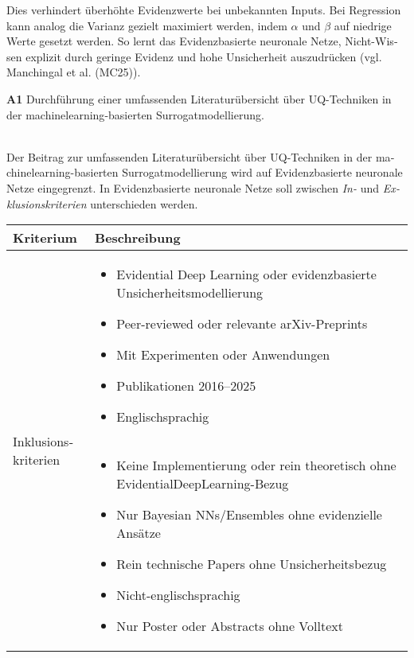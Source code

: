 \begin{otherlanguage}{ngerman}
Dies verhindert überhöhte Evidenzwerte bei unbekannten Inputs. Bei Regression kann analog die Varianz gezielt maximiert werden, indem $\alpha$ und $\beta$ auf niedrige Werte gesetzt werden. So lernt das \gls{Evidenzbasierte neuronale Netze}, Nicht-Wissen explizit durch geringe Evidenz und hohe Unsicherheit auszudrücken (vgl. Manchingal et al. (MC25)).



\pagebreak


\textbf{A1} Durchführung einer umfassenden Literaturübersicht über UQ-Techniken in der \gls{machinelearning}-basierten Surrogatmodellierung.
\par\noindent\\

Der Beitrag zur umfassenden Literaturübersicht über UQ-Techniken in der \gls{machinelearning}-basierten Surrogatmodellierung wird auf \gls{Evidenzbasierte neuronale Netze} eingegrenzt. In \gls{Evidenzbasierte neuronale Netze} soll zwischen \textit{In-} und \textit{Exklusionskriterien} unterschieden werden.

\begin{table}[htbp]
\centering
\footnotesize
\begin{tabularx}{\textwidth}{|l|X|}
\hline
\textbf{Kriterium} & \hspace{0.6em}\textbf{Beschreibung} \\ \hline
\multirow{7}{*}{\centering Inklusionskriterien} &
\begin{itemize}[topsep=0em, itemsep=0em, leftmargin=*, label={}]
  \item Evidential Deep Learning oder evidenzbasierte Unsicherheitsmodellierung
  \item Peer-reviewed oder relevante arXiv-Preprints
  \item Mit Experimenten oder Anwendungen
  \item Publikationen 2016–2025
  \item Englischsprachig
\end{itemize} \\ \hline
\multirow{7}{*}{\centering Exklusionskriterien} &
\begin{itemize}[topsep=0em, itemsep=0em, leftmargin=*, label={}]
  \item Keine Implementierung oder rein theoretisch ohne \gls{EvidentialDeepLearning}-Bezug
  \item Nur Bayesian NNs/Ensembles ohne evidenzielle Ansätze
  \item Rein technische Papers ohne Unsicherheitsbezug
  \item Nicht-englischsprachig
  \item Nur Poster oder Abstracts ohne Volltext
\end{itemize} \\ \hline
\end{tabularx}


\end{table}
\end{otherlanguage}
